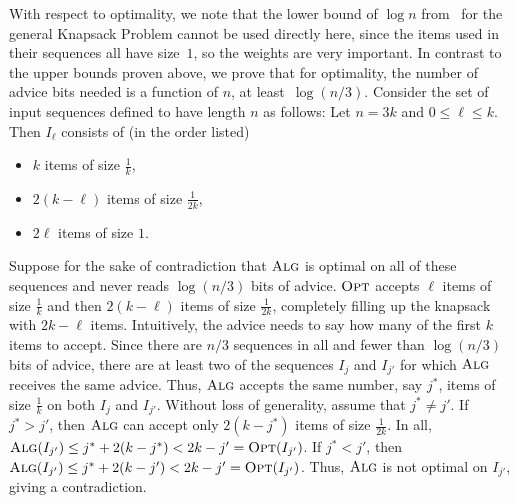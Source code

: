 \documentclass[a4paper,UKenglish,cleveref, autoref, thm-restate]{lipics-v2021}
\newcommand{\ALG}{\ensuremath{\operatorname{\textsc{Alg}}}\xspace}
\newcommand{\OPT}{\ensuremath{\operatorname{\textsc{Opt}}}\xspace}
\begin{document}
With respect to optimality, we note that the lower bound of $\log n$
from~\cite{BKKR14} for the general Knapsack Problem cannot be used
directly here, since the items used in their sequences all have
size~$1$, so the weights are very important.  In contrast to the upper
bounds proven above, we prove that for optimality, the number of
advice bits needed is a function of $n$, at least~$\log (n/3)$.
Consider the set of input sequences defined to have length $n$ as
follows: Let $n=3k$ and $0\leq \ell\leq k$. Then $I_\ell$ consists of
(in the order listed)
\begin{itemize} 
\item  $k$ items of size $\frac{1}{k}$,
\item $2(k-\ell)$ items of size $\frac{1}{2k}$,
  \item $2\ell$ items of size $1$.
\end{itemize}
Suppose for the sake of contradiction that \ALG is optimal on all of
these sequences and never reads $\log(n/3)$ bits of advice.  \OPT
accepts $\ell$ items of size $\frac{1}{k}$ and then $2(k-\ell)$ items
of size $\frac{1}{2k}$, completely filling up the knapsack with
$2k-\ell$ items.  Intuitively, the advice needs to say how many of the
first $k$ items to accept. Since there are $n/3$ sequences in all and
fewer than $\log(n/3)$ bits of advice, there are at least two of the
sequences $I_j$ and $I_{j'}$ for which \ALG receives the same
advice. Thus, \ALG accepts the same number, say $j^*$, items of size
$\frac{1}{k}$ on both $I_j$ and $I_{j'}$. Without loss of generality,
assume that $j^*\not= j'$. If $j^* > j'$, then \ALG can accept only
$2(k-j^*)$ items of size $\frac{1}{2k}$. In all,
$\ALG(I_{j'}) \leq j^*+2(k-j^*) <2k-j' = \OPT(I_{j'})$. If $j^* < j'$,
then $\ALG(I_{j'}) \leq j^* +2(k-j') < 2k-j' = \OPT(I_{j'})$. Thus,
\ALG is not optimal on $I_{j'}$, giving a contradiction.




\end{document}
